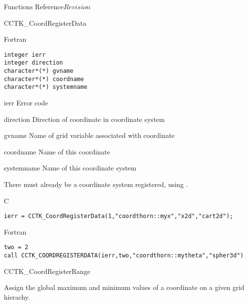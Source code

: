 \begin{cactuspart}{ Functions Reference}{}{$Revision$}
\begin{FunctionDescription}{CCTK\_CoordRegisterData}
\begin{SynopsisSection}
\begin{Synopsis}{Fortran}
\begin{verbatim}
integer ierr
integer direction
character*(*) gvname
character*(*) coordname
character*(*) systemname \end{verbatim}
\end{Synopsis}
\end{SynopsisSection}
\begin{ParameterSection}
\begin{Parameter}{ierr}
Error code
\end{Parameter}
\begin{Parameter}{direction}
Direction of coordinate in coordinate system
\end{Parameter}
\begin{Parameter}{gvname}
Name of grid variable associated with coordinate
\end{Parameter}
\begin{Parameter}{coordname}
Name of this coordinate
\end{Parameter}
\begin{Parameter}{systemname}
Name of this coordinate system
\end{Parameter}
\end{ParameterSection}
\begin{Discussion}
There must already be a coordinate system registered,
using .
\end{Discussion}
\begin{ExampleSection}
\begin{Example}{C}
\begin{verbatim}
ierr = CCTK_CoordRegisterData(1,"coordthorn::myx","x2d","cart2d");
\end{verbatim}
\end{Example}
\begin{Example}{Fortran}
\begin{verbatim}
two = 2
call CCTK_COORDREGISTERDATA(ierr,two,"coordthorn::mytheta","spher3d")
\end{verbatim}
\end{Example}
\end{ExampleSection}
\end{FunctionDescription}


\begin{FunctionDescription}{CCTK\_CoordRegisterRange}%
{Assign the global maximum and minimum
values of a coordinate on a given grid hierachy.

}
\end{FunctionDescription}
\end{cactuspart}
